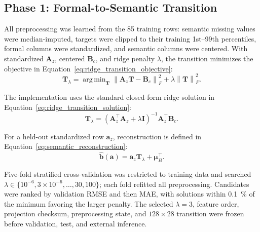\documentclass{ceurart}
\newcommand{\matA}{\mathbf{A}}
\newcommand{\matB}{\mathbf{B}}
\newcommand{\matT}{\mathbf{T}}
\DeclareMathOperator*{\argmin}{arg\,min}
\begin{document}
\subsection{Phase 1: Formal-to-Semantic Transition}\label{subsec:formal_to_semantic_transition}

All preprocessing was learned from the 85 training rows: semantic missing values were median-imputed, targets were clipped to their training 1st--99th percentiles, formal columns were standardized, and semantic columns were centered. With standardized \(\matA_z\), centered \(\matB_c\), and ridge penalty \(\lambda\), the transition minimizes the objective in Equation~\eqref{eq:ridge_transition_objective}:
\begin{equation}
\matT_\lambda=\argmin_{\matT}\left\|\matA_z\matT-\matB_c\right\|_F^2+\lambda\left\|\matT\right\|_F^2 .
\label{eq:ridge_transition_objective}
\end{equation}

The implementation uses the standard closed-form ridge solution in Equation~\eqref{eq:ridge_transition_solution}:
\begin{equation}
\matT_\lambda=(\matA_z^\top\matA_z+\lambda\mathbf I)^{-1}\matA_z^\top\matB_c .
\label{eq:ridge_transition_solution}
\end{equation}

For a held-out standardized row \(\mathbf a_z\), reconstruction is defined in Equation~\eqref{eq:semantic_reconstruction}:
\begin{equation}
\widehat{\mathbf b}(\mathbf a)=\mathbf a_z\matT_\lambda+\boldsymbol\mu_B^\top .
\label{eq:semantic_reconstruction}
\end{equation}

Five-fold stratified cross-validation was restricted to training data and searched \(\lambda\in\{10^{-6},3\times10^{-6},\ldots,30,100\}\); each fold refitted all preprocessing. Candidates were ranked by validation RMSE and then MAE, with solutions within 0.1~\% of the minimum favoring the larger penalty. The selected \(\lambda=3\), feature order, projection checksum, preprocessing state, and \(128\times28\) transition were frozen before validation, test, and external inference.

\end{document}
